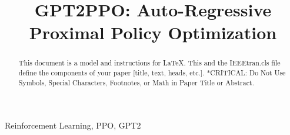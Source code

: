 \def\BibTeX{{\rm B\kern-.05em{\sc i\kern-.025em b}\kern-.08em
    T\kern-.1667em\lower.7ex\hbox{E}\kern-.125emX}}


\title{GPT2PPO: Auto-Regressive Proximal Policy Optimization\\
}

\author{
    \and
}

\maketitle


\begin{abstract}
    This document is a model and instructions for \LaTeX.
    This and the IEEEtran.cls file define the components of your paper [title, text, heads, etc.]. *CRITICAL: Do Not Use Symbols, Special Characters, Footnotes,
    or Math in Paper Title or Abstract.
\end{abstract}

\begin{IEEEkeywords}
    Reinforcement Learning, PPO, GPT2
\end{IEEEkeywords}


